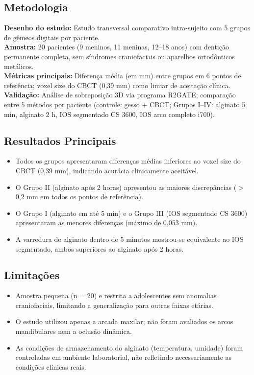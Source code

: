 \subsection{Metodologia}
\textbf{Desenho do estudo:} Estudo transversal comparativo intra-sujeito com 5
grupos de gêmeos digitais por paciente. \\
\textbf{Amostra:} 20 pacientes (9 meninos, 11 meninas, 12--18 anos) com dentição
permanente completa, sem síndromes craniofaciais ou aparelhos ortodônticos
metálicos. \\
\textbf{Métricas principais:} Diferença média (em mm) entre grupos em 6 pontos
de referência; voxel size do CBCT (0,39 mm) como limiar de aceitação clínica. \\
\textbf{Validação:} Análise de sobreposição 3D via programa R2GATE\texttrademark;
comparação entre 5 métodos por paciente (controle: gesso + CBCT; Grupos I--IV:
alginato 5 min, alginato 2 h, IOS segmentado CS 3600, IOS arco completo i700).

\subsection{Resultados Principais}
\begin{itemize}
  \item Todos os grupos apresentaram diferenças médias inferiores ao voxel size
        do CBCT (0,39 mm), indicando acurácia clinicamente aceitável.
  \item O Grupo II (alginato após 2 horas) apresentou as maiores discrepâncias
        ($>$ 0,2 mm em todos os pontos de referência).
  \item O Grupo I (alginato em até 5 min) e o Grupo III (IOS segmentado CS 3600)
        apresentaram as menores diferenças (máximo de 0,053 mm).
  \item A varredura de alginato dentro de 5 minutos mostrou-se equivalente ao
        IOS segmentado, ambos superiores ao alginato após 2 horas.
\end{itemize}

\subsection{Limitações}
\begin{itemize}
  \item Amostra pequena (n = 20) e restrita a adolescentes sem anomalias
        craniofaciais, limitando a generalização para outras faixas etárias.
  \item O estudo utilizou apenas a arcada maxilar; não foram avaliados os
        arcos mandibulares nem a oclusão dinâmica.
  \item As condições de armazenamento do alginato (temperatura, umidade) foram
        controladas em ambiente laboratorial, não refletindo necessariamente
        as condições clínicas reais.
\end{itemize}

